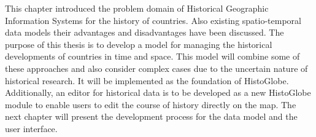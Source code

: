 This chapter introduced the problem domain of Historical Geographic Information Systems for the history of countries. Also existing spatio-temporal data models their advantages and disadvantages have been discussed. The purpose of this thesis is to develop a model for managing the historical developments of countries in time and space. This model will combine some of these approaches and also consider complex cases due to the uncertain nature of historical research. It will be implemented as the foundation of HistoGlobe. Additionally, an editor for historical data is to be developed as a new HistoGlobe module to enable users to edit the course of history directly on the map. The next chapter will present the development process for the data model and the user interface.

